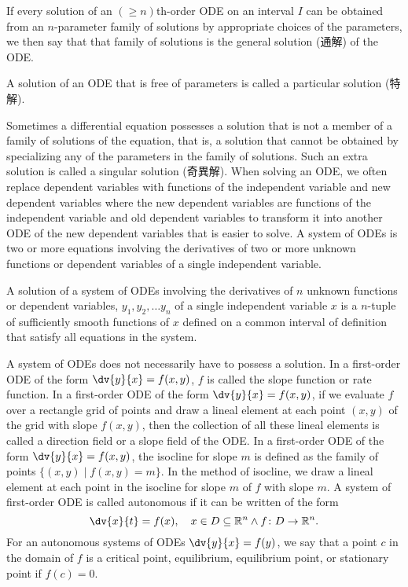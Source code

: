\documentclass[a4paper,12pt]{report}
\begin{document}
\begin{itemize}
\begin{itemize}
If every solution of an $(\geq n)$th-order ODE on an interval $I$ can be obtained from an $n$-parameter family of solutions by appropriate choices of the parameters, we then say that that family of solutions is the general solution (通解) of the ODE.

A solution of an ODE that is free of parameters is called a particular solution (特解).

Sometimes a differential equation possesses a solution that is not a member of a family of solutions of the equation, that is, a solution that cannot be obtained by specializing any of the parameters in the family of solutions. Such an extra solution is called a singular solution (奇異解).
When solving an ODE, we often replace dependent variables with functions of the independent variable and new dependent variables where the new dependent variables are functions of the independent variable and old dependent variables to transform it into another ODE of the new dependent variables that is easier to solve.
A system of ODEs is two or more equations involving the derivatives of two or more unknown functions or dependent variables of a single independent variable.

A solution of a system of ODEs involving the derivatives of $n$ unknown functions or dependent variables, $y_1,y_2,\dots y_n$ of a single independent variable $x$ is a $n$-tuple of sufficiently smooth functions of $x$ defined on a common interval of definition that satisfy all equations in the system.

A system of ODEs does not necessarily have to possess a solution.
In a first-order ODE of the form $\dv{y}{x}=f(x,y)$, $f$ is called the slope function or rate function.
In a first-order ODE of the form $\dv{y}{x}=f(x,y)$, if we evaluate $f$ over a rectangle grid of points and draw a lineal element at each point $(x,y)$ of the grid with slope $f(x,y)$, then the collection of all these lineal elements is called a direction field or a slope field of the ODE.
In a first-order ODE of the form $\dv{y}{x}=f(x,y)$, the isocline for slope $m$ is defined as the family of points $\{(x,y)\mid f(x,y)=m\}$. In the method of isocline, we draw a lineal element at each point in the isocline for slope $m$ of $f$ with slope $m$.
A system of first-order ODE is called autonomous if it can be written of the form
\[\dv{x}{t}=f(x),\quad x\in D\subseteq\mathbb{R}^n\land f\colon D\to\mathbb{R}^n.\]
For an autonomous systems of ODEs $\dv{y}{x}=f(y)$, we say that a point $c$ in the domain of $f$ is a critical point, equilibrium, equilibrium point, or stationary point if $f(c)=0$.


\end{itemize}
\end{itemize}
\end{document}
